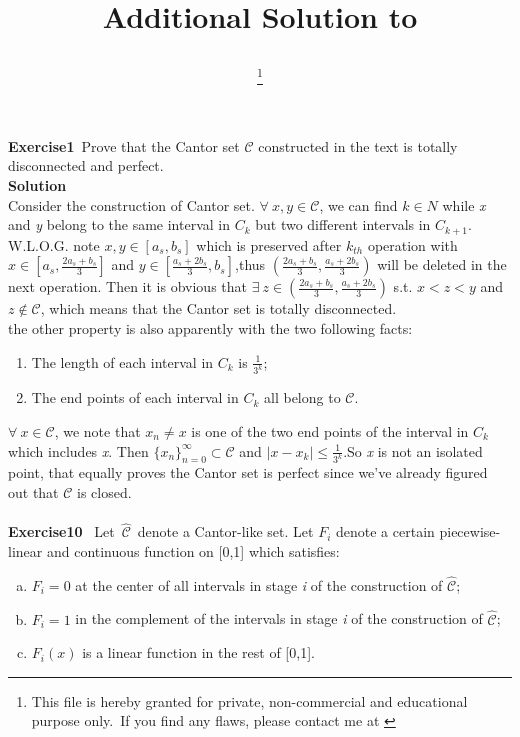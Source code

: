 \documentclass{article}
\title{
    \vspace{2in}
    \textmd{\Huge{\textbf{\hmwkClass}}}\\
    \normalsize\vspace{0.1in}\LARGE{\textbf{Additional Solution to \hmwkTitle}}\\
    \vspace{0.1in}\Huge{\textit{\hmwkClassInstructor}}
    \vspace{2.5in}
    \author{\huge{\textbf{\hmwkAuthorName}}\thanks{\large{This file is hereby granted for private, non-commercial and educational purpose only.\ If you find any flaws, please contact me at \email{bernardniu97@gmail.com}}}}
	\date{}
}
\begin{document}

\maketitle

\pagebreak


\Large{\textbf{Exercise1}}\ Prove that the Cantor set $\mathcal{C}$ constructed in the text is totally disconnected and perfect.\\
\Large{\textbf{Solution}}\\
  	Consider the construction of Cantor set. $\forall\ x,y \in \mathcal{C}$, we can find $k \in N$ while \emph{x} and \emph{y} belong to the same interval in $C_k$ but two different intervals in $C_{k+1}$. W.L.O.G. note $x,y \in [a_s,b_s]$ which is preserved after $k_{th}$ operation with $x \in [a_s, \frac{2a_s+b_s}{3}]$ and $y \in [\frac{a_s+2b_s}{3}, b_s]$,thus $(\frac{2a_s+b_s}{3}, \frac{a_s+2b_s}{3})$ will be deleted in the next operation. Then it is obvious that $\exists \ z \in (\frac{2a_s+b_s}{3}, \frac{a_s+2b_s}{3})$ s.t. $x < z < y$ and $z \notin \mathcal{C}$, which means that the Cantor set is totally disconnected.\\
  	the other property is also apparently with the two following facts:
  	\begin{enumerate}
  		\item The length of each interval in $C_{k}$ is $\frac{1}{3^k}$;
  		\item The end points of each interval in $C_{k}$ all belong to $\mathcal{C}$.
  	\end{enumerate}
  	$\forall\ x \in \mathcal{C}$, we note that $x_n \neq x$ is one of the two end points of the interval in $C_k$ which includes \emph{x}. Then $\{x_n\}^{\infty}_{n = 0} \subset \mathcal{C}$ and $|x-x_k|\leq\frac{1}{3^k}$.So \emph{x} is not an isolated point, that equally proves the Cantor set is perfect since we've already figured out that $\mathcal{C}$ is closed.
\\
\\
\Large{\textbf{Exercise10}} \    Let\ $\hat{\mathcal{C}}$\ denote a Cantor-like set. Let $F_i$ denote a certain piecewise-linear and continuous function on [0,1] which satisfies:
\begin{enumerate}[a)]
	\item $F_i = 0$ at the center of all intervals in stage \emph{i} of the construction of $\hat{\mathcal{C}}$;
	\item $F_i = 1$ in the complement of the intervals in stage \emph{i} of the construction of $\hat{\mathcal{C}}$;
	\item $F_i(x)$ is a linear function in the rest of [0,1].
\end{enumerate}
\end{document}
